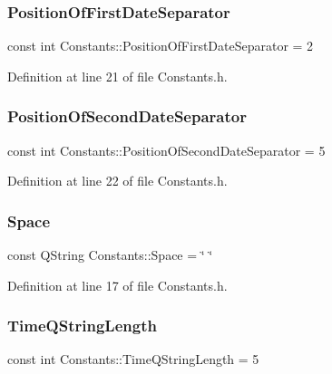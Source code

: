 \subsubsection{\texorpdfstring{Position\+Of\+First\+Date\+Separator}{PositionOfFirstDateSeparator}}
{\footnotesize\ttfamily const int Constants\+::\+Position\+Of\+First\+Date\+Separator = 2\hspace{0.3cm}{\ttfamily [static]}}



Definition at line 21 of file Constants.\+h.

\hypertarget{classConstants_a6d9e83adc428b25381bc25b2e38843ea}{}\label{classConstants_a6d9e83adc428b25381bc25b2e38843ea} 
\subsubsection{\texorpdfstring{Position\+Of\+Second\+Date\+Separator}{PositionOfSecondDateSeparator}}
{\footnotesize\ttfamily const int Constants\+::\+Position\+Of\+Second\+Date\+Separator = 5\hspace{0.3cm}{\ttfamily [static]}}



Definition at line 22 of file Constants.\+h.

\hypertarget{classConstants_ade4aef58a5c7280c4f0bd40ba7b30f3c}{}\label{classConstants_ade4aef58a5c7280c4f0bd40ba7b30f3c} 
\subsubsection{\texorpdfstring{Space}{Space}}
{\footnotesize\ttfamily const Q\+String Constants\+::\+Space = \char`\"{} \char`\"{}\hspace{0.3cm}{\ttfamily [static]}}



Definition at line 17 of file Constants.\+h.

\hypertarget{classConstants_a577e140cbb46e0fe143af8c18c29cee1}{}\label{classConstants_a577e140cbb46e0fe143af8c18c29cee1} 
\subsubsection{\texorpdfstring{Time\+Q\+String\+Length}{TimeQStringLength}}
{\footnotesize\ttfamily const int Constants\+::\+Time\+Q\+String\+Length = 5\hspace{0.3cm}{\ttfamily [static]}}




